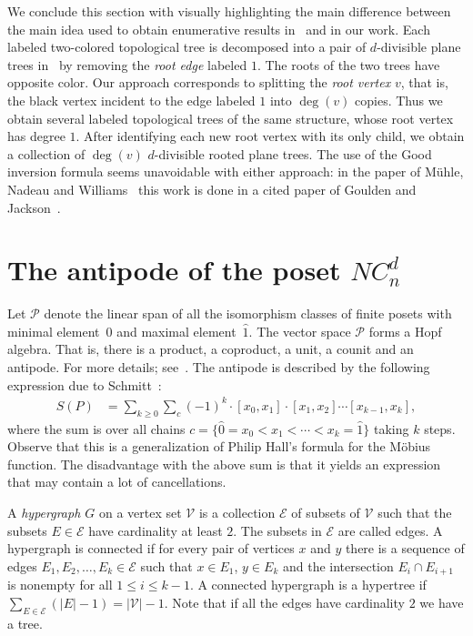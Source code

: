 \documentclass[11pt]{amsart}
\numberwithin{equation}{section}
\newcommand{\hz}{\widehat{0}}
\newcommand{\ho}{\widehat{1}}
\begin{document}
We conclude this section with visually highlighting the main difference between
the main idea used to obtain enumerative results
in~\cite{Muhle_Nadeau_Williams} and in our work. Each
labeled two-colored topological tree is decomposed into a pair of
$d$-divisible plane trees in~\cite{Muhle_Nadeau_Williams} by removing
the {\em root edge} labeled $1$. The roots of the two trees have
opposite color. Our approach corresponds to splitting the {\em root
  vertex} $v$, that is, the black vertex incident to the edge labeled
$1$ into $\deg(v)$ copies. Thus we obtain several labeled topological
trees of the same structure, whose root vertex has degree $1$. After
identifying each new root vertex with its only child, we obtain a
collection of $\deg(v)$ $d$-divisible rooted plane trees. The use of the
Good inversion formula seems unavoidable with either approach: in the
paper of M\"uhle, Nadeau and Williams~\cite{Muhle_Nadeau_Williams} this
work is done in a cited paper of Goulden and Jackson~\cite{Goulden_Jackson}. 


\section{The antipode of the poset $NC^{d}_{n}$}
\label{section_antipode}

Let ${\mathcal P}$ denote the linear span of all the isomorphism classes of finite posets
with minimal element~$\hz$ and maximal element~$\ho$.
The vector space ${\mathcal P}$ forms a Hopf algebra. That is, there is
a product, a coproduct, a unit, a counit and an antipode.
For more details; see~\cite{Ehrenborg,Schmitt}.
The antipode is described by the following expression due to
Schmitt~\cite[Theorem~6.1]{Schmitt}:
\begin{align}
S(P)
& =
\sum_{k \geq 0}
\sum_{c}
(-1)^{k}
\cdot
[x_{0},x_{1}] \cdot [x_{1},x_{2}] \cdots [x_{k-1},x_{k}] ,
\label{equation_Schmitt_antipode}
\end{align}
where the sum is over all chains
$c = \{\hz = x_{0} < x_{1} < \cdots < x_{k} = \ho\}$
taking $k$ steps.
Observe that this is a generalization of Philip Hall's
formula for the M\"obius function.
The disadvantage with the above sum is that it yields
an expression that may contain a lot of cancellations.

A {\em hypergraph $G$} on a vertex set ${\mathcal V}$
is a collection ${\mathcal E}$ of subsets of ${\mathcal V}$
such that the subsets $E \in {\mathcal E}$ have cardinality at least $2$.
The subsets in ${\mathcal E}$ are called edges.
A hypergraph is connected if for every pair of vertices $x$ and $y$ there is a
sequence of edges $E_{1}, E_{2}, \ldots, E_{k} \in {\mathcal E}$ such that
$x \in E_{1}$, $y \in E_{k}$ and the intersection
$E_{i} \cap E_{i+1}$ is nonempty for all $1 \leq i \leq k-1$.
A connected hypergraph is a hypertree if 
$\sum_{E \in {\mathcal E}} (|E|-1) = |{\mathcal V}| - 1$.
Note that if all the edges have cardinality $2$ we have a tree.
\end{document}
